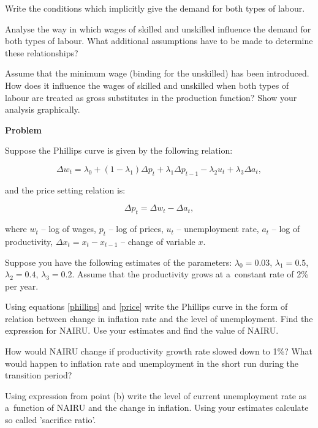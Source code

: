 \documentclass[a4paper, notitlepage, 11pt]{article}
\newcounter{zadlicz}[section]%
\newcommand{\tytul}[2]{\setcounter{equation}{0}\addtocounter{zadlicz}{1}\vspace{\abovedisplayskip}\noindent\textbf{#1\ \thezadlicz #2}}%
\begin{document}
\begin{wylicz}
\item Write the conditions which implicitly give the demand for both types of labour.
\item Analyse the way in which wages of skilled and unskilled influence the demand for both types of labour. What additional assumptions have to be made to determine these relationships?
\item Assume that the minimum wage (binding for the unskilled) has been introduced. How does it influence the wages of skilled and unskilled when both types of labour are treated as gross substitutes in the production function? Show your analysis graphically.
\end{wylicz}

\tytul{Problem}{}

\noindent%
Suppose the Phillips curve is given by the following relation:

\begin{equation}
\Delta w_t=\lambda_0 + (1-\lambda_1)\Delta p_t + \lambda_1\Delta p_{t-1}-\lambda_2 u_t + \lambda_3\Delta a_t,\label{phillips}
\end{equation}

and the price setting relation is:

\begin{equation}
\Delta p_t=\Delta w_t - \Delta a_t,\label{price}
\end{equation}

where $w_t$ -- log of wages, $p_t$ -- log of prices, $u_t$ -- unemployment rate, $a_t$ -- log of productivity, $\Delta x_t=x_t-x_{t-1}$ -- change of variable $x$.

Suppose you have the following estimates of the parameters: $\lambda_0=0.03$, $\lambda_1=0.5$, $\lambda_2=0.4$, $\lambda_3=0.2$. Assume that the productivity grows at a~constant rate of 2\% per year.

\begin{wylicz}
\item Using equations \eqref{phillips} and \eqref{price} write the Phillips curve in the form of relation between change in inflation rate and the level of unemployment. Find the expression for NAIRU. Use your estimates and find the value of NAIRU.
\item How would NAIRU change if productivity growth rate slowed down to 1\%? What would happen to inflation rate and unemployment in the short run during the transition period?
\item Using expression from point (b) write the level of current unemployment rate as a~function of NAIRU and the change in inflation. Using your estimates calculate so called 'sacrifice ratio'.
\end{wylicz}
\end{document}
